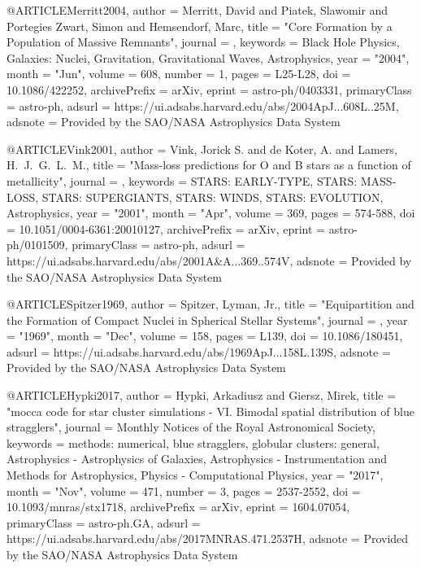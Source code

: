 \documentclass[twocolumn,tighten]{aastex63}
\begin{document}
@ARTICLE{Merritt2004,
       author = {{Merritt}, David and {Piatek}, Slawomir and {Portegies Zwart}, Simon and
         {Hemsendorf}, Marc},
        title = "{Core Formation by a Population of Massive Remnants}",
      journal = {\apjl},
     keywords = {Black Hole Physics, Galaxies: Nuclei, Gravitation, Gravitational Waves, Astrophysics},
         year = "2004",
        month = "Jun",
       volume = {608},
       number = {1},
        pages = {L25-L28},
          doi = {10.1086/422252},
archivePrefix = {arXiv},
       eprint = {astro-ph/0403331},
 primaryClass = {astro-ph},
       adsurl = {https://ui.adsabs.harvard.edu/abs/2004ApJ...608L..25M},
      adsnote = {Provided by the SAO/NASA Astrophysics Data System}
}

@ARTICLE{Vink2001,
       author = {{Vink}, Jorick S. and {de Koter}, A. and {Lamers}, H.~J.~G.~L.~M.},
        title = "{Mass-loss predictions for O and B stars as a function of metallicity}",
      journal = {\aap},
     keywords = {STARS: EARLY-TYPE, STARS: MASS-LOSS, STARS: SUPERGIANTS, STARS: WINDS, STARS: EVOLUTION, Astrophysics},
         year = "2001",
        month = "Apr",
       volume = {369},
        pages = {574-588},
          doi = {10.1051/0004-6361:20010127},
archivePrefix = {arXiv},
       eprint = {astro-ph/0101509},
 primaryClass = {astro-ph},
       adsurl = {https://ui.adsabs.harvard.edu/abs/2001A&A...369..574V},
      adsnote = {Provided by the SAO/NASA Astrophysics Data System}
}

@ARTICLE{Spitzer1969,
       author = {{Spitzer}, Lyman, Jr.},
        title = "{Equipartition and the Formation of Compact Nuclei in Spherical Stellar Systems}",
      journal = {\apjl},
         year = "1969",
        month = "Dec",
       volume = {158},
        pages = {L139},
          doi = {10.1086/180451},
       adsurl = {https://ui.adsabs.harvard.edu/abs/1969ApJ...158L.139S},
      adsnote = {Provided by the SAO/NASA Astrophysics Data System}
}

@ARTICLE{Hypki2017,
       author = {{Hypki}, Arkadiusz and {Giersz}, Mirek},
        title = "{mocca code for star cluster simulations - VI. Bimodal spatial distribution of blue stragglers}",
      journal = {Monthly Notices of the Royal Astronomical Society},
     keywords = {methods: numerical, blue stragglers, globular clusters: general, Astrophysics - Astrophysics of Galaxies, Astrophysics - Instrumentation and Methods for Astrophysics, Physics - Computational Physics},
         year = "2017",
        month = "Nov",
       volume = {471},
       number = {3},
        pages = {2537-2552},
          doi = {10.1093/mnras/stx1718},
archivePrefix = {arXiv},
       eprint = {1604.07054},
 primaryClass = {astro-ph.GA},
       adsurl = {https://ui.adsabs.harvard.edu/abs/2017MNRAS.471.2537H},
      adsnote = {Provided by the SAO/NASA Astrophysics Data System}
}
\end{document}
